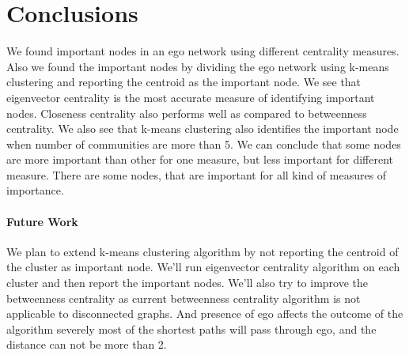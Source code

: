 \section{Conclusions}
\label{conc}

%
%
%

We found important nodes in an ego network using different centrality
measures.  Also we found the important nodes by dividing the ego
network using k-means clustering and reporting the centroid as the
important node.  We see that eigenvector centrality is the most
accurate measure of identifying important nodes.  Closeness centrality
also performs well as compared to betweenness centrality.  We also see
that k-means clustering also identifies the important node when number
of communities are more than 5.  We can conclude that some nodes are
more important than other for one measure, but less important for
different measure.  There are some nodes, that are important for all
kind of measures of importance.

\paragraph{Future Work}
We plan to extend k-means clustering algorithm by not reporting the
centroid of the cluster as important node.  We'll run eigenvector
centrality algorithm on each cluster and then report the important
nodes.  We'll also try to improve the betweenness centrality as
current betweenness centrality algorithm is not applicable to
disconnected graphs.  And presence of ego affects the outcome of the
algorithm severely most of the shortest paths will pass through ego,
and the distance can not be more than 2.

%
%
%
%
%
%
%


